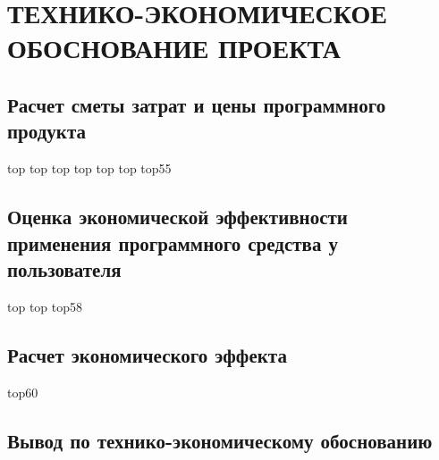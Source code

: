 


\section{ТЕХНИКО-ЭКОНОМИЧЕСКОЕ ОБОСНОВАНИЕ ПРОЕКТА}
\label{sec:economics}

\subsection{Расчет сметы затрат и цены программного продукта}
\label{sec:economics:description}

\newpage
top
\newpage
top
\newpage
top
\newpage
top
\newpage
top
\newpage
top
\newpage
top55
\newpage


\subsection{Оценка экономической эффективности применения программного средства у пользователя}
\label{sec:economics:description}

top
\newpage
top
\newpage
top58
\newpage


\subsection{Расчет экономического эффекта}
\label{sec:economics:estimate}

\newpage
top60
\cite{palitsyn}
\cite{labour_calendar}
\cite{belstat_average_wage}
\newpage


\subsection{Вывод по технико-экономическому обоснованию}
\label{sec:economics:effect}

